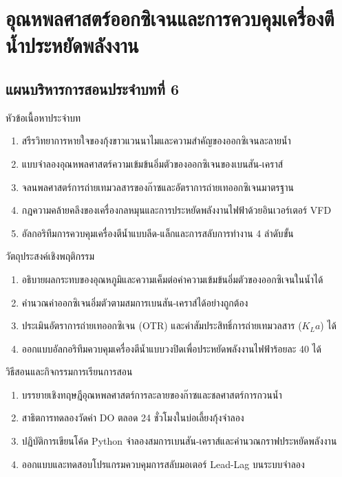\chapter{อุณหพลศาสตร์ออกซิเจนและการควบคุมเครื่องตีน้ำประหยัดพลังงาน}
\label{chap:ch06}

\section*{แผนบริหารการสอนประจำบทที่ 6}

\begin{planbox}{หัวข้อเนื้อหาประจำบท}
\begin{enumerate}[topsep=2pt, itemsep=1pt, partopsep=0pt, parsep=0pt, leftmargin=1.5em]
    \item สรีรวิทยาการหายใจของกุ้งขาวแวนนาไมและความสำคัญของออกซิเจนละลายน้ำ
    \item แบบจำลองอุณหพลศาสตร์ความเข้มข้นอิ่มตัวของออกซิเจนของเบนสัน-เคราส์
    \item จลนพลศาสตร์การถ่ายเทมวลสารของก๊าซและอัตราการถ่ายเทออกซิเจนมาตรฐาน
    \item กฎความคล้ายคลึงของเครื่องกลหมุนและการประหยัดพลังงานไฟฟ้าด้วยอินเวอร์เตอร์ VFD
    \item อัลกอริทึมการควบคุมเครื่องตีน้ำแบบลีด-แล็กและการสลับการทำงาน 4 ลำดับขั้น
\end{enumerate}
\end{planbox}

\begin{planbox}{วัตถุประสงค์เชิงพฤติกรรม}
\begin{enumerate}[topsep=2pt, itemsep=1pt, partopsep=0pt, parsep=0pt, leftmargin=1.5em]
    \item อธิบายผลกระทบของอุณหภูมิและความเค็มต่อค่าความเข้มข้นอิ่มตัวของออกซิเจนในน้ำได้
    \item คำนวณค่าออกซิเจนอิ่มตัวตามสมการเบนสัน-เคราส์ได้อย่างถูกต้อง
    \item ประเมินอัตราการถ่ายเทออกซิเจน (OTR) และค่าสัมประสิทธิ์การถ่ายเทมวลสาร ($K_L a$) ได้
    \item ออกแบบอัลกอริทึมควบคุมเครื่องตีน้ำแบบวงปิดเพื่อประหยัดพลังงานไฟฟ้าร้อยละ 40 ได้
\end{enumerate}
\end{planbox}

\newpage

\begin{planbox}{วิธีสอนและกิจกรรมการเรียนการสอน}
\begin{enumerate}[topsep=2pt, itemsep=1pt, partopsep=0pt, parsep=0pt, leftmargin=1.5em]
    \item บรรยายเชิงทฤษฎีอุณหพลศาสตร์การละลายของก๊าซและชลศาสตร์การกวนน้ำ
    \item สาธิตการทดลองวัดค่า DO ตลอด 24 ชั่วโมงในบ่อเลี้ยงกุ้งจำลอง
    \item ปฏิบัติการเขียนโค้ด Python จำลองสมการเบนสัน-เคราส์และคำนวณกราฟประหยัดพลังงาน
    \item ออกแบบและทดสอบโปรแกรมควบคุมการสลับมอเตอร์ Lead-Lag บนระบบจำลอง
\end{enumerate}
\end{planbox}

